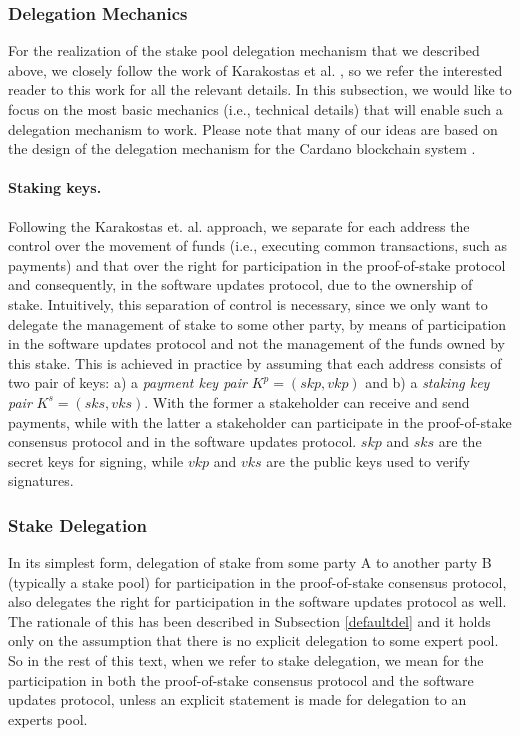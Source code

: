 \subsubsection{Delegation Mechanics}
For the realization of the stake pool delegation mechanism that we described
above, we closely follow the work of Karakostas et al. \cite{stakepools}, so we
refer the interested reader to this work for all the relevant details.
%
In this subsection, we would like to focus on the most basic mechanics (i.e.,
technical details) that will enable such a delegation mechanism to work. Please
note that many of our ideas are based on the design of the delegation mechanism
for the Cardano blockchain system \cite{deldesign}.

\paragraph{Staking keys.}
Following the Karakostas et. al. \cite{stakepools} approach, we separate for
each address the control over the movement of funds (i.e., executing common
transactions, such as payments) and that over the right for participation in the
proof-of-stake protocol and consequently, in the software updates protocol, due
to the ownership of stake. Intuitively, this separation of control is necessary,
since we only want to delegate the management of stake to some other party, by
means of participation in the software updates protocol and not the management
of the funds owned by this stake. This is achieved in practice by assuming that
each address consists of two pair of keys: a) a \emph{payment key pair}
$K^p = (skp,vkp)$ and b) a \emph{staking key pair} $K^s = (sks, vks)$. With the
former a stakeholder can receive and send payments, while with the latter a
stakeholder can participate in the proof-of-stake consensus protocol and in the
software updates protocol. $skp$ and $sks$ are the secret keys for signing,
while $vkp$ and $vks$ are the public keys used to verify signatures.

\subsubsection*{Stake Delegation}
In its simplest form, delegation of stake from some party A to another party B
(typically a stake pool) for participation in the proof-of-stake consensus
protocol, also delegates the right for participation in the software updates
protocol as well. The rationale of this has been described in Subsection
\ref{defaultdel} and it holds only on the assumption that there is no explicit
delegation to some expert pool. So in the rest of this text, when we refer to
stake delegation, we mean for the participation in both the proof-of-stake
consensus protocol and the software updates protocol, unless an explicit
statement is made for delegation to an experts pool.

